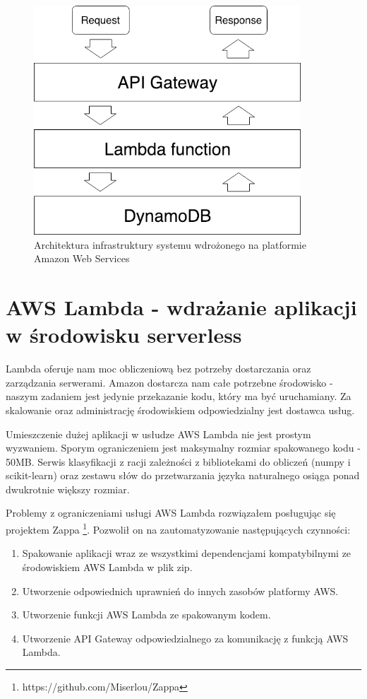 \newpage
\begin{figure}[H]
    \centering
    \includegraphics[width=10cm]{images/wdrozenie/aws_Architecture.png}
    \caption{Architektura infrastruktury systemu wdrożonego na platformie Amazon Web Services}
    \label{fig:architecture}
    \end{figure}

\section{AWS Lambda - wdrażanie aplikacji w środowisku serverless}

Lambda oferuje nam moc obliczeniową bez potrzeby dostarczania oraz zarządzania serwerami. Amazon dostarcza nam całe potrzebne środowisko - naszym zadaniem jest jedynie przekazanie kodu, który ma być uruchamiany. Za skalowanie oraz administrację środowiskiem odpowiedzialny jest dostawca usług.

Umieszczenie dużej aplikacji w usłudze AWS Lambda nie jest prostym wyzwaniem. Sporym ograniczeniem jest maksymalny rozmiar spakowanego kodu - 50MB. Serwis klasyfikacji z racji zależności z bibliotekami do obliczeń (numpy i scikit-learn) oraz zestawu słów do przetwarzania języka naturalnego osiąga ponad dwukrotnie większy rozmiar. 

Problemy z ograniczeniami usługi AWS Lambda rozwiązałem posługując się projektem Zappa \footnote{https://github.com/Miserlou/Zappa}. Pozwolił on na zautomatyzowanie następujących czynności:

\begin{enumerate}
    \item Spakowanie aplikacji wraz ze wszystkimi dependencjami kompatybilnymi ze środowiskiem AWS Lambda w plik zip.
    
    \item Utworzenie odpowiednich uprawnień do innych zasobów platformy AWS.
    
    \item Utworzenie funkcji AWS Lambda ze spakowanym kodem.
    
    \item Utworzenie API Gateway odpowiedzialnego za komunikację z funkcją AWS Lambda.
\end{enumerate}

